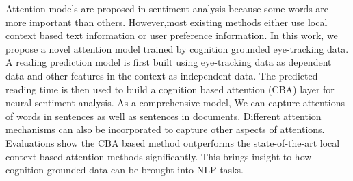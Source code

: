 Attention models are proposed in sentiment analysis because some words are more important than others. However,most existing methods either use local context based text information or user preference information. In this work, we propose a novel attention model trained by cognition grounded eye-tracking data. A reading prediction model is first built using eye-tracking data as dependent data and other features in the context as independent data. The predicted reading time is then used to build a cognition based attention (CBA) layer for neural sentiment analysis. As a comprehensive model, We can capture attentions of words in sentences as well as sentences in documents. Different attention mechanisms can also be incorporated to capture other aspects of attentions. Evaluations show the CBA based method outperforms the state-of-the-art local context based attention methods significantly. This brings insight to how cognition grounded data can be brought into NLP tasks.
